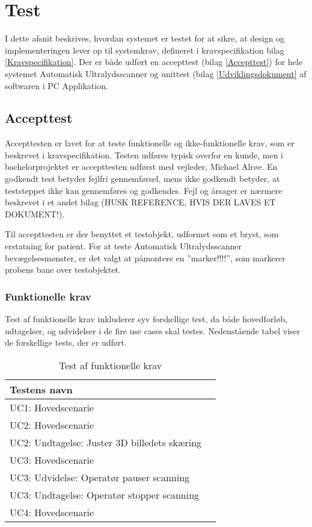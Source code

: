 \chapter{Test}\label{Test}
I dette afsnit beskrives, hvordan systemet er testet for at sikre, at design og implementeringen lever op til systemkrav, defineret i kravspecifikation bilag \ref{Kravspecifikation}. Der er både udført en accepttest (bilag \ref{Accepttest})  for hele systemet Automatisk Ultralydsscanner og unittest (bilag \ref{Udviklingsdokument} af softwaren i PC Applikation. 

\section{Accepttest}
Accepttesten er lavet for at teste funktionelle og ikke-funktionelle krav, som er beskrevet i kravspecifikation. Testen udføres typisk overfor en kunde, men i bachelorprojektet er accepttesten udførst med vejleder, Michael Alrøe. En godkendt test betyder fejlfri gennemførsel, mens ikke godkendt betyder, at teststeppet ikke kan gennemføres og godkendes. Fejl og årsager er nærmere beskrevet i et andet bilag (HUSK REFERENCE, HVIS DER LAVES ET DOKUMENT!). 

Til accepttesten er der benyttet et testobjekt, udformet som et bryst, som erstatning for patient. For at teste Automatisk Ultralydsscanner bevægelsesmønster, er det valgt at påmontere en ”marker!!!!”, som markerer probens bane over testobjektet. 

\subsection{Funktionelle krav} 
Test af funktionelle krav inkluderer syv forskellige test, da både hovedforløb, udtagelser, og udvidelser i de fire use cases skal testes. Nedenstående tabel viser de forskellige tests, der er udført. 

\begin{table}[htb]
\centering
\begin{tabular}{ | l | p{} | }
\hline
\textbf{Testens navn} \\\hline
UC1: Hovedscenarie\\\hline 
UC2: Hovedscenarie \\\hline 
UC2: Undtagelse: Juster 3D billedets skæring \\\hline 
UC3: Hovedscenarie \\\hline 
UC3: Udvidelse: Operatør pauser scanning \\\hline 
UC3: Undtagelse: Operatør stopper scanning \\\hline 
UC4: Hovedscenarie \\\hline 
\end{tabular}
\caption{Test af funktionelle krav} 
\end{table}

